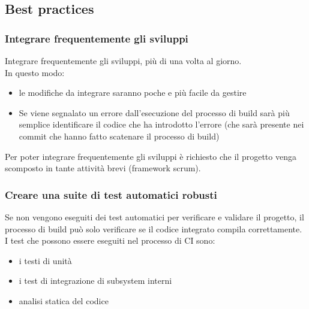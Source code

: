 \documentclass[10pt, a4paper]{article}
\begin{document}
\subsection{Best practices}
\subsubsection*{Integrare frequentemente gli sviluppi}
Integrare frequentemente gli sviluppi, più di una volta al giorno. \\
In questo modo:
\begin{itemize}
    \item le modifiche da integrare saranno poche e più facile da gestire
    \item Se viene segnalato un errore dall’esecuzione del processo di build sarà più semplice
identificare il codice che ha introdotto l’errore (che sarà presente nei commit che
hanno fatto scatenare il processo di build)
\end{itemize}
Per poter integrare frequentemente gli sviluppi è richiesto che il progetto venga
scomposto in tante attività brevi (framework scrum).

\subsubsection*{Creare una suite di test automatici robusti}
Se non vengono eseguiti dei test automatici per verificare e validare il progetto, il
processo di build può solo verificare se il codice integrato compila correttamente.\\
I test che possono essere eseguiti nel processo di CI sono:
\begin{itemize}
    \item i testi di unità
    \item i test di integrazione di subsystem interni
    \item analisi statica del codice
\end{itemize}
\end{document}
